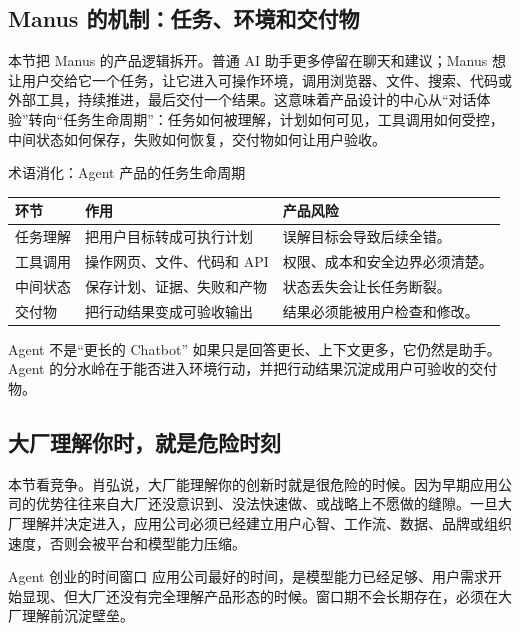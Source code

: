 \documentclass[a4paper]{article}
\begin{document}
\subsection{Manus 的机制：任务、环境和交付物}

本节把 Manus 的产品逻辑拆开。普通 AI 助手更多停留在聊天和建议；Manus 想让用户交给它一个任务，让它进入可操作环境，调用浏览器、文件、搜索、代码或外部工具，持续推进，最后交付一个结果。这意味着产品设计的中心从“对话体验”转向“任务生命周期”：任务如何被理解，计划如何可见，工具调用如何受控，中间状态如何保存，失败如何恢复，交付物如何让用户验收。

\begin{knowledgebox}{术语消化：Agent 产品的任务生命周期}
\noindent\begin{tabularx}{\textwidth}{p{}p{}X}
\toprule
环节 & 作用 & 产品风险 \\
\midrule
任务理解 & 把用户目标转成可执行计划 & 误解目标会导致后续全错。 \\
工具调用 & 操作网页、文件、代码和 API & 权限、成本和安全边界必须清楚。 \\
中间状态 & 保存计划、证据、失败和产物 & 状态丢失会让长任务断裂。 \\
交付物 & 把行动结果变成可验收输出 & 结果必须能被用户检查和修改。 \\
\bottomrule
\end{tabularx}
\end{knowledgebox}

\begin{warningbox}{Agent 不是“更长的 Chatbot”}
如果只是回答更长、上下文更多，它仍然是助手。Agent 的分水岭在于能否进入环境行动，并把行动结果沉淀成用户可验收的交付物。
\end{warningbox}

\subsection{大厂理解你时，就是危险时刻}

本节看竞争。肖弘说，大厂能理解你的创新时就是很危险的时候。因为早期应用公司的优势往往来自大厂还没意识到、没法快速做、或战略上不愿做的缝隙。一旦大厂理解并决定进入，应用公司必须已经建立用户心智、工作流、数据、品牌或组织速度，否则会被平台和模型能力压缩。

\begin{importantbox}{Agent 创业的时间窗口}
应用公司最好的时间，是模型能力已经足够、用户需求开始显现、但大厂还没有完全理解产品形态的时候。窗口期不会长期存在，必须在大厂理解前沉淀壁垒。
\end{importantbox}
\end{document}
